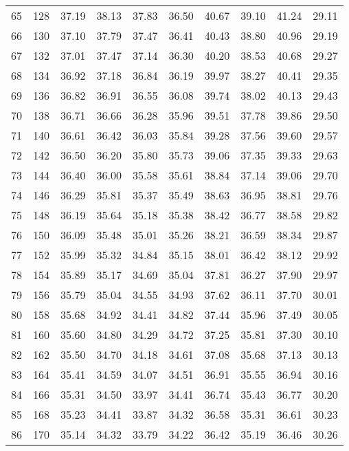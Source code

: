 \begin{longtable}{rrllllllll}
		65 & 128 & 37.19 & 38.13 & 37.83 & 36.50 & 40.67 & 39.10 & 41.24 & 29.11 \\ 
		66 & 130 & 37.10 & 37.79 & 37.47 & 36.41 & 40.43 & 38.80 & 40.96 & 29.19 \\ 
		67 & 132 & 37.01 & 37.47 & 37.14 & 36.30 & 40.20 & 38.53 & 40.68 & 29.27 \\ 
		68 & 134 & 36.92 & 37.18 & 36.84 & 36.19 & 39.97 & 38.27 & 40.41 & 29.35 \\ 
		69 & 136 & 36.82 & 36.91 & 36.55 & 36.08 & 39.74 & 38.02 & 40.13 & 29.43 \\ 
		70 & 138 & 36.71 & 36.66 & 36.28 & 35.96 & 39.51 & 37.78 & 39.86 & 29.50 \\ 
		71 & 140 & 36.61 & 36.42 & 36.03 & 35.84 & 39.28 & 37.56 & 39.60 & 29.57 \\ 
		72 & 142 & 36.50 & 36.20 & 35.80 & 35.73 & 39.06 & 37.35 & 39.33 & 29.63 \\ 
		73 & 144 & 36.40 & 36.00 & 35.58 & 35.61 & 38.84 & 37.14 & 39.06 & 29.70 \\ 
		74 & 146 & 36.29 & 35.81 & 35.37 & 35.49 & 38.63 & 36.95 & 38.81 & 29.76 \\ 
		75 & 148 & 36.19 & 35.64 & 35.18 & 35.38 & 38.42 & 36.77 & 38.58 & 29.82 \\ 
		76 & 150 & 36.09 & 35.48 & 35.01 & 35.26 & 38.21 & 36.59 & 38.34 & 29.87 \\ 
		77 & 152 & 35.99 & 35.32 & 34.84 & 35.15 & 38.01 & 36.42 & 38.12 & 29.92 \\ 
		78 & 154 & 35.89 & 35.17 & 34.69 & 35.04 & 37.81 & 36.27 & 37.90 & 29.97 \\ 
		79 & 156 & 35.79 & 35.04 & 34.55 & 34.93 & 37.62 & 36.11 & 37.70 & 30.01 \\ 
		80 & 158 & 35.68 & 34.92 & 34.41 & 34.82 & 37.44 & 35.96 & 37.49 & 30.05 \\ 
		81 & 160 & 35.60 & 34.80 & 34.29 & 34.72 & 37.25 & 35.81 & 37.30 & 30.10 \\ 
		82 & 162 & 35.50 & 34.70 & 34.18 & 34.61 & 37.08 & 35.68 & 37.13 & 30.13 \\ 
		83 & 164 & 35.41 & 34.59 & 34.07 & 34.51 & 36.91 & 35.55 & 36.94 & 30.16 \\ 
		84 & 166 & 35.31 & 34.50 & 33.97 & 34.41 & 36.74 & 35.43 & 36.77 & 30.20 \\ 
		85 & 168 & 35.23 & 34.41 & 33.87 & 34.32 & 36.58 & 35.31 & 36.61 & 30.23 \\ 
		86 & 170 & 35.14 & 34.32 & 33.79 & 34.22 & 36.42 & 35.19 & 36.46 & 30.26 \\ 

\end{longtable}
